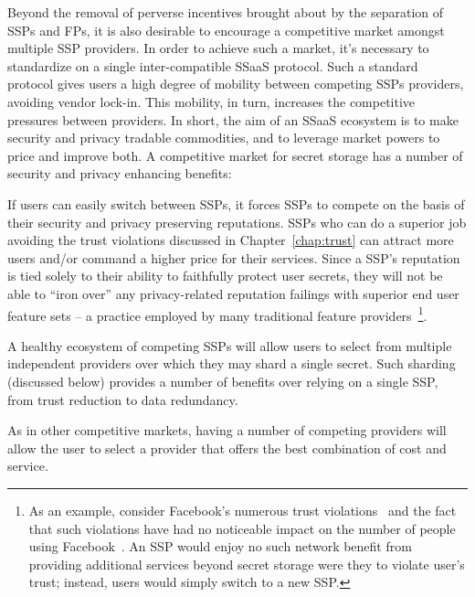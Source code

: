 Beyond the removal of perverse incentives brought about by the
separation of SSPs and FPs, it is also desirable to encourage a
competitive market amongst multiple SSP providers. In order to achieve
such a market, it's necessary to standardize on a single
inter-compatible SSaaS protocol. Such a standard protocol gives users
a high degree of mobility between competing SSPs providers, avoiding
vendor lock-in. This mobility, in turn, increases the competitive
pressures between providers. In short, the aim of an SSaaS ecosystem
is to make security and privacy tradable commodities, and to leverage
market powers to price and improve both. A competitive market for
secret storage has a number of security and privacy enhancing
benefits:

\begin{packed_desc}
\item[Reputation:] If users can easily switch between SSPs, it forces
  SSPs to compete on the basis of their security and privacy
  preserving reputations. SSPs who can do a superior job avoiding the
  trust violations discussed in Chapter~\ref{chap:trust} can attract
  more users and/or command a higher price for their services. Since a
  SSP's reputation is tied solely to their ability to faithfully
  protect user secrets, they will not be able to ``iron over'' any
  privacy-related reputation failings with superior end user feature
  sets -- a practice employed by many traditional feature
  providers~\footnote{As an example, consider Facebook's numerous
    trust violations~\cite{goel2014, lomas2014, tsukayama2014} and the
    fact that such violations have had no noticeable impact on the
    number of people using Facebook~\cite{foster2014}. An SSP would
    enjoy no such network benefit from providing additional services
    beyond secret storage were they to violate user's trust; instead,
    users would simply switch to a new SSP.}.
\item[Multiple Providers:] A healthy ecosystem of competing SSPs will
  allow users to select from multiple independent providers over which
  they may shard a single secret. Such sharding (discussed below)
  provides a number of benefits over relying on a single SSP, from
  trust reduction to data redundancy.
\item[Cost:] As in other competitive markets, having a number of
  competing providers will allow the user to select a provider that
  offers the best combination of cost and service.
\end{packed_desc}

